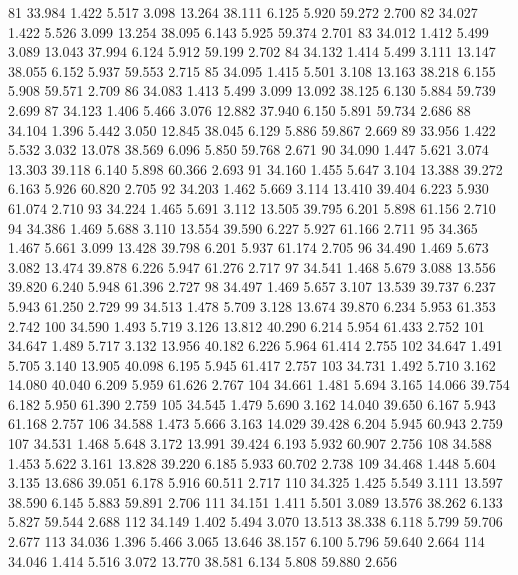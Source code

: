 \documentclass[a4paper,11pt]{scrartcl}
\begin{document}
\begin{Schunk}
\begin{Soutput}
81  33.984  1.422  5.517  3.098 13.264   38.111  6.125  5.920   59.272  2.700
82  34.027  1.422  5.526  3.099 13.254   38.095  6.143  5.925   59.374  2.701
83  34.012  1.412  5.499  3.089 13.043   37.994  6.124  5.912   59.199  2.702
84  34.132  1.414  5.499  3.111 13.147   38.055  6.152  5.937   59.553  2.715
85  34.095  1.415  5.501  3.108 13.163   38.218  6.155  5.908   59.571  2.709
86  34.083  1.413  5.499  3.099 13.092   38.125  6.130  5.884   59.739  2.699
87  34.123  1.406  5.466  3.076 12.882   37.940  6.150  5.891   59.734  2.686
88  34.104  1.396  5.442  3.050 12.845   38.045  6.129  5.886   59.867  2.669
89  33.956  1.422  5.532  3.032 13.078   38.569  6.096  5.850   59.768  2.671
90  34.090  1.447  5.621  3.074 13.303   39.118  6.140  5.898   60.366  2.693
91  34.160  1.455  5.647  3.104 13.388   39.272  6.163  5.926   60.820  2.705
92  34.203  1.462  5.669  3.114 13.410   39.404  6.223  5.930   61.074  2.710
93  34.224  1.465  5.691  3.112 13.505   39.795  6.201  5.898   61.156  2.710
94  34.386  1.469  5.688  3.110 13.554   39.590  6.227  5.927   61.166  2.711
95  34.365  1.467  5.661  3.099 13.428   39.798  6.201  5.937   61.174  2.705
96  34.490  1.469  5.673  3.082 13.474   39.878  6.226  5.947   61.276  2.717
97  34.541  1.468  5.679  3.088 13.556   39.820  6.240  5.948   61.396  2.727
98  34.497  1.469  5.657  3.107 13.539   39.737  6.237  5.943   61.250  2.729
99  34.513  1.478  5.709  3.128 13.674   39.870  6.234  5.953   61.353  2.742
100 34.590  1.493  5.719  3.126 13.812   40.290  6.214  5.954   61.433  2.752
101 34.647  1.489  5.717  3.132 13.956   40.182  6.226  5.964   61.414  2.755
102 34.647  1.491  5.705  3.140 13.905   40.098  6.195  5.945   61.417  2.757
103 34.731  1.492  5.710  3.162 14.080   40.040  6.209  5.959   61.626  2.767
104 34.661  1.481  5.694  3.165 14.066   39.754  6.182  5.950   61.390  2.759
105 34.545  1.479  5.690  3.162 14.040   39.650  6.167  5.943   61.168  2.757
106 34.588  1.473  5.666  3.163 14.029   39.428  6.204  5.945   60.943  2.759
107 34.531  1.468  5.648  3.172 13.991   39.424  6.193  5.932   60.907  2.756
108 34.588  1.453  5.622  3.161 13.828   39.220  6.185  5.933   60.702  2.738
109 34.468  1.448  5.604  3.135 13.686   39.051  6.178  5.916   60.511  2.717
110 34.325  1.425  5.549  3.111 13.597   38.590  6.145  5.883   59.891  2.706
111 34.151  1.411  5.501  3.089 13.576   38.262  6.133  5.827   59.544  2.688
112 34.149  1.402  5.494  3.070 13.513   38.338  6.118  5.799   59.706  2.677
113 34.036  1.396  5.466  3.065 13.646   38.157  6.100  5.796   59.640  2.664
114 34.046  1.414  5.516  3.072 13.770   38.581  6.134  5.808   59.880  2.656

\end{Soutput}
\end{Schunk}
\end{document}
